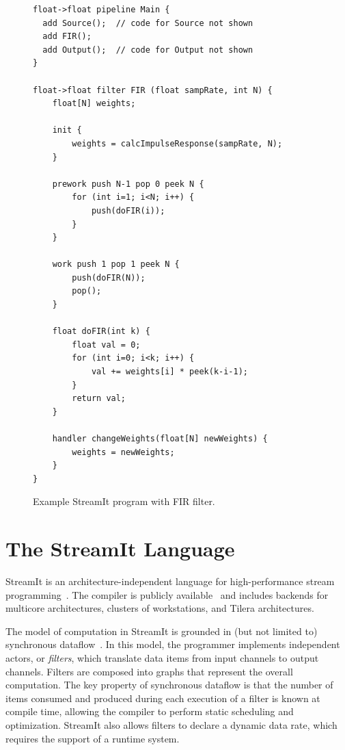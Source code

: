 \begin{figure}[t]
\eightpoint
\begin{verbatim}
float->float pipeline Main {
  add Source();  // code for Source not shown
  add FIR();
  add Output();  // code for Output not shown
}

float->float filter FIR (float sampRate, int N) {
    float[N] weights;

    init {
        weights = calcImpulseResponse(sampRate, N);
    }

    prework push N-1 pop 0 peek N {
        for (int i=1; i<N; i++) {
            push(doFIR(i));
        }
    }

    work push 1 pop 1 peek N {
        push(doFIR(N));
        pop();
    }

    float doFIR(int k) {
        float val = 0;
        for (int i=0; i<k; i++) {
            val += weights[i] * peek(k-i-1);
        }
        return val;
    }

    handler changeWeights(float[N] newWeights) {
        weights = newWeights;
    }
}
\end{verbatim}

\caption{Example StreamIt program with FIR filter.\protect\label{fig:fir-pipeline}}
\end{figure}

\section{The StreamIt Language}

StreamIt is an architecture-independent language for high-performance
stream programming~\cite{thies-cc02}.  The compiler is publicly
available~\cite{streamitweb} and includes backends for multicore
architectures, clusters of workstations, and Tilera architectures.

The model of computation in StreamIt is grounded in (but not limited
to) synchronous dataflow~\cite{lee87}.  In this model, the programmer
implements independent actors, or {\it filters}, which translate data
items from input channels to output channels.  Filters are composed
into graphs that represent the overall computation.  The key property
of synchronous dataflow is that the number of items consumed and
produced during each execution of a filter is known at compile time,
allowing the compiler to perform static scheduling and optimization.
StreamIt also allows filters to declare a dynamic data rate, which
requires the support of a runtime system.


